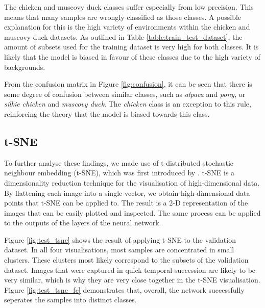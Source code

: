 \documentclass{l4proj}
\begin{document}
The chicken and muscovy duck classes suffer especially from low precision. This means that many samples are wrongly classified as those classes. A possible explanation for this is the high variety of environments within the chicken and muscovy duck datasets. As outlined in Table \ref{table:train_test_dataset}, the amount of subsets used for the training dataset is very high for both classes. It is likely that the model is biased in favour of these classes due to the high variety of backgrounds. 

From the confusion matrix in Figure \ref{fig:confusion}, it can be seen that there is some degree of confusion between similar classes, such as \textit{alpaca} and \textit{pony}, or \textit{silkie chicken} and \textit{muscovy duck}. The \textit{chicken} class is an exception to this rule, reinforcing the theory that the model is biased towards this class.

\subsection{t-SNE}
\label{tsne}

To further analyse these findings, we made use of t-distributed stochastic neighbour embedding (t-SNE), which was first introduced by \citet{maaten_visualizing_2008}. t-SNE is a dimensionality reduction technique for the visualisation of high-dimensional data. By flattening each image into a single vector, we obtain high-dimensional data points that t-SNE can be applied to. The result is a 2-D representation of the images that can be easily plotted and inspected. The same process can be applied to the outputs of the layers of the neural network.

Figure \ref{fig:test_tsne} shows the result of applying t-SNE to the validation dataset. In all four visualisations, most samples are concentrated in small clusters. These clusters most likely correspond to the subsets of the validation dataset. Images that were captured in quick temporal succession are likely to be very similar, which is why they are very close together in the t-SNE visualisation. Figure \ref{fig:test_tsne_fc} demonstrates that, overall, the network successfully seperates the samples into distinct classes.
\end{document}

